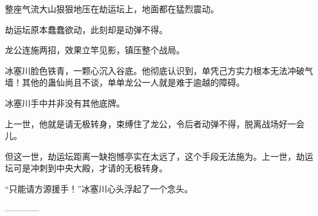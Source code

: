 \begin{this_body}
整座气流大山狠狠地压在劫运坛上，地面都在猛烈震动。

劫运坛原本蠢蠢欲动，此刻却是动弹不得。

龙公连施两招，效果立竿见影，镇压整个战局。

冰塞川脸色铁青，一颗心沉入谷底。他彻底认识到，单凭己方实力根本无法冲破气墙！其他的蛊仙尚且不谈，单单龙公一人就是难于逾越的障碍。

冰塞川手中并非没有其他底牌。

上一世，他就是请无极转身，束缚住了龙公，令后者动弹不得，脱离战场好一会儿。

但这一世，劫运坛距离一缺抱憾亭实在太远了，这个手段无法施为。上一世，劫运坛可是冲刺到中央大殿，才请的无极转身。

“只能请方源援手！”冰塞川心头浮起了一个念头。

------------

\end{this_body}

